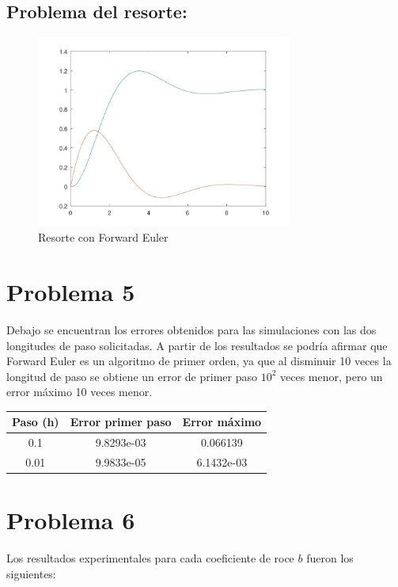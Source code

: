 \documentclass[a4paper,12pt]{article}
\begin{document}
\subsection*{Problema del resorte:}

\begin{figure}[H]
\centering
\includegraphics[width=0.75\textwidth]{img/ej4_2.jpeg}
\caption{Resorte con Forward Euler}
\end{figure}


\section*{Problema 5}

Debajo se encuentran los errores obtenidos para las simulaciones con las dos longitudes de paso solicitadas. A partir de los resultados se podría afirmar que Forward Euler es un algoritmo de primer orden, ya que al disminuir 10 veces la longitud de paso se obtiene un error de primer paso \(10^2\) veces menor, pero un error máximo 10 veces menor.

\begin{table}[H]
\centering
\begin{tabular}{@{}ccc@{}}
\toprule
Paso (h) & Error primer paso & Error máximo \\
\midrule
0.1 & 9.8293e-03 & 0.066139 \\
0.01 & 9.9833e-05 & 6.1432e-03 \\
\bottomrule
\end{tabular}
\end{table}

\section*{Problema 6}

Los resultados experimentales para cada coeficiente de roce \( b \) fueron los siguientes:
\end{document}
